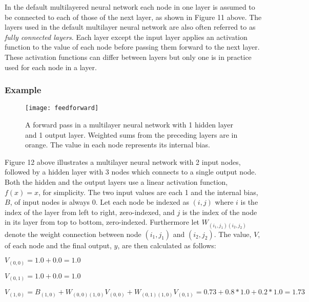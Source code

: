 \documentclass[titlepage]{article}
\begin{document}
\vskip 0.3cm

\noindent
In the default multilayered neural network \cite{charu} each node in one layer is assumed to be connected to each of those of the next layer, as shown in Figure 11 above. The layers used in the default multilayer neural network are also often referred to as \emph{fully connected layers}. Each layer except the input layer applies an activation function to the value of each node before passing them forward to the next layer. These activation functions can differ between layers but only one is in practice used for each node in a layer.

\vskip 0.2cm

\subsubsection{Example}

\begin{figure}[h]
    \centering
    \texttt{[image: feedforward]}
    \caption{A forward pass in a multilayer neural network with 1 hidden layer and 1 output layer. Weighted sums from the preceding layers are in orange. The value in each node represents its internal bias.}
\end{figure}

\noindent
Figure 12 above illustrates a multilayer neural network with 2 input nodes, followed by a hidden layer with 3 nodes which connects to a single output node. Both the hidden and the output layers use a linear activation function, $f(x) = x$, for simplicity. The two input values are each 1 and the internal bias, $B$, of input nodes is always 0. Let each node be indexed as $(i, j)$ where $i$ is the index of the layer from left to right, zero-indexed, and $j$ is the index of the node in its layer from top to bottom, zero-indexed. Furthermore let $W_{(i_{1}, j_{1}) (i_{2}, j_{2})}$ denote the weight connection between node $(i_{1}, j_{1})$ and $(i_{2}, j_{2})$. The value, $V$, of each node and the final output, $y$, are then calculated as follows: 

\vskip 0.8cm

\centerline{$V_{(0, 0)} = 1.0 + 0.0 = 1.0$}

\vskip 0.2cm

\centerline{$V_{(0, 1)} = 1.0 + 0.0 = 1.0$}

\vskip 0.5cm

\centerline{$V_{(1, 0)} = B_{(1, 0)} + W_{(0, 0) (1, 0)} V_{(0, 0)} + W_{(0, 1) (1, 0)} V_{(0, 1)} = 0.73 + 0.8 * 1.0 + 0.2 * 1.0 = 1.73$}
\end{document}
